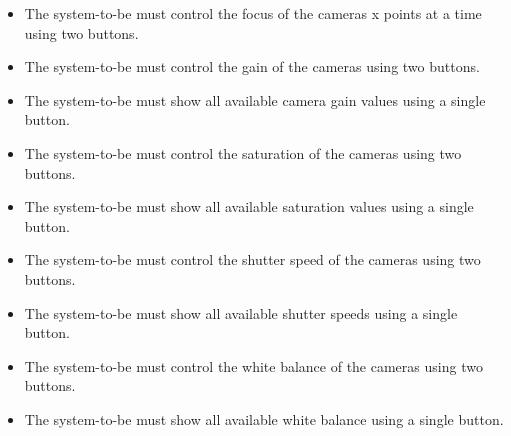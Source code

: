 \begin{itemize}
	\item The system-to-be must control the focus of the cameras x points at a time using two buttons.
	\item The system-to-be must control the gain of the cameras using two buttons.
	\item The system-to-be must show all available camera gain values using a single button.
	\item The system-to-be must control the saturation of the cameras using two buttons.
	\item The system-to-be must show all available saturation values using a single button.
	\item The system-to-be must control the shutter speed of the cameras using two buttons.
	\item The system-to-be must show all available shutter speeds using a single button.
	\item The system-to-be must control the white balance of the cameras using two buttons.
	\item The system-to-be must show all available white balance using a single button.
\end{itemize}


